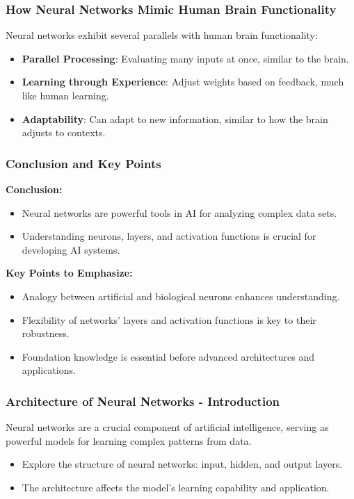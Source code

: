 \documentclass[aspectratio=169]{beamer}
\begin{document}
\begin{frame}[fragile]
    \frametitle{How Neural Networks Mimic Human Brain Functionality}
    Neural networks exhibit several parallels with human brain functionality:
    \begin{itemize}
        \item \textbf{Parallel Processing}: Evaluating many inputs at once, similar to the brain.
        \item \textbf{Learning through Experience}: Adjust weights based on feedback, much like human learning.
        \item \textbf{Adaptability}: Can adapt to new information, similar to how the brain adjusts to contexts.
    \end{itemize}
\end{frame}

\begin{frame}[fragile]
    \frametitle{Conclusion and Key Points}
    \textbf{Conclusion:}
    \begin{itemize}
        \item Neural networks are powerful tools in AI for analyzing complex data sets.
        \item Understanding neurons, layers, and activation functions is crucial for developing AI systems.
    \end{itemize}
    \textbf{Key Points to Emphasize:}
    \begin{itemize}
        \item Analogy between artificial and biological neurons enhances understanding.
        \item Flexibility of networks' layers and activation functions is key to their robustness.
        \item Foundation knowledge is essential before advanced architectures and applications.
    \end{itemize}
\end{frame}

\begin{frame}[fragile]
    \frametitle{Architecture of Neural Networks - Introduction}
    Neural networks are a crucial component of artificial intelligence, serving as powerful models for learning complex patterns from data.
    
    \begin{itemize}
        \item Explore the structure of neural networks: input, hidden, and output layers.
        \item The architecture affects the model's learning capability and application.
    \end{itemize}
\end{frame}
\end{document}
